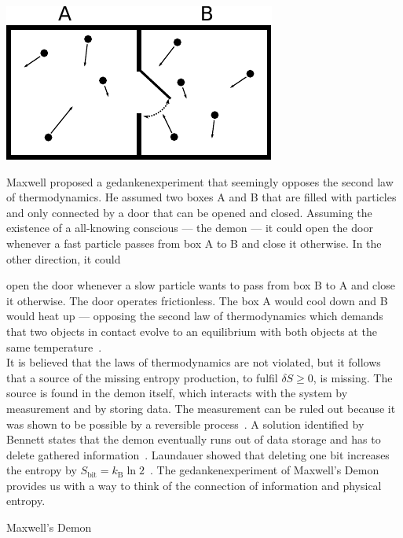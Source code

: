 \begin{Technical Point}[t] 
\begin{minipage}{0.03\textwidth}
\hfill\vspace{0.1cm}
\end{minipage}%
\begin{minipage}{0.4\textwidth}
 \includegraphics{../images/maxwell.pdf}
\end{minipage}
\hfill
\begin{minipage}{0.55\textwidth}
  Maxwell proposed a gedankenexperiment that seemingly opposes the second law of thermodynamics. He assumed two boxes A and B that are filled with particles and only connected by a door that can be opened and closed.  Assuming the existence of a all-knowing conscious --- the demon --- it could open the door whenever a fast particle passes from  box A to B and close
  it otherwise. In the other direction,  it could \vspace*{0.055cm} \end{minipage}  open the door whenever a slow particle wants to pass from box B to A and close it otherwise.
  The door operates frictionless. The box A would cool down and B would heat up --- opposing the second law of thermodynamics which demands that two objects in contact evolve to an equilibrium with both objects at the same temperature~\cite{leff2014maxwell}. \\
  
  It is believed that the laws of thermodynamics are not violated, but it follows that a source of the missing entropy production, to fulfil $\delta S \ge 0$, is missing. The source is found in the demon itself, which interacts with the system by measurement and by storing data. The measurement can be ruled out because it was shown to be possible by a reversible process~\cite{landauer1961irreversibility}. A solution identified by Bennett states that the demon eventually runs out of data storage and has to delete gathered information~\cite{bennett1987demons}. Laundauer showed that deleting one bit increases the entropy by $S_{\text{bit}} = k_{\mathrm{B}}\ln 2$~\cite{bennett2003notes}. The gedankenexperiment of Maxwell's Demon provides us with a way to think of the connection of information and physical entropy.  
  \caption{Maxwell's Demon}\label{tec:Maxwell}
\end{Technical Point}
 
